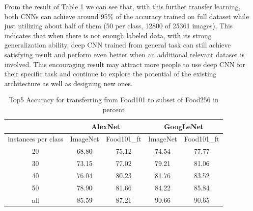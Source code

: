 From the result of Table \ref{tab:cross} we can see that, with this further transfer learning, both CNNs can achieve around 95\% of the accuracy trained on full dataset while just utilizing about half of them (50 per class, 12800 of 25361 images). This indicates that when there is not enough labeled data, with its strong generalization ability, deep CNN trained from general task can still achieve satisfying result and perform even better when an additional relevant dataset is involved. This encouraging result may attract more people to use deep CNN for their specific task and continue to explore the potential of the existing architecture as well as designing new ones.

\begin{table}[htbp]
  \centering
  \caption{Top5 Accuracy for transferring from Food101 to subset of Food256 in percent}
    \begin{tabular}{c|cc|cc}
    \toprule
          & \multicolumn{2}{c|}{AlexNet} & \multicolumn{2}{c}{GoogLeNet} \\
    \midrule
    instances per class & ImageNet  & Food101\_ft    &  ImageNet  & Food101\_ft \\ \midrule
    20    & 68.80  & {75.12} & 74.54 & {77.77} \\
    30    & 73.15 & {77.02} & 79.21 & {81.06} \\
    40    & 76.04 & {80.23} & 81.76 & {83.52} \\
    50    & 78.90  & {81.66} & 84.22 & {85.84} \\
    all    & 85.59 &  {87.21} & {90.66 }&   {90.65}     \\
    \bottomrule
    \end{tabular}%
  \label{tab:cross}%
\end{table}%

